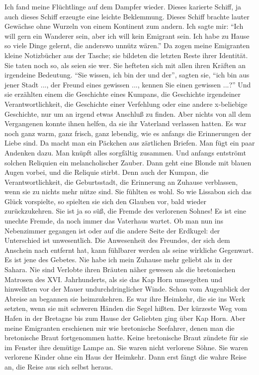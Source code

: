 \documentclass[12pt,ngerman,parskip=half]{scrartcl}
\begin{document}
Ich fand meine Flüchtlinge auf dem Dampfer wieder. Dieses karierte Schiff, ja auch dieses Schiff erzeugte eine leichte Beklemmung. Dieses Schiff brachte lauter Gewächse ohne Wurzeln von einem Kontinent zum andern. Ich sagte mir: \enquote{Ich will gern ein Wanderer sein, aber ich will kein Emigrant sein. Ich habe zu Hause so viele Dinge gelernt, die anderswo unnütz wären.} Da zogen meine Emigranten kleine Notizbücher aus der Tasche; sie bildeten die letzten Reste ihrer Identität. Sie taten noch so, als seien sie wer. Sie hefteten sich mit allen ihren Kräften an irgendeine Bedeutung. \enquote{Sie wissen, ich bin der und der}, sagten sie, \enquote{ich bin aus jener Stadt ..., der Freund eines gewissen ..., kennen Sie einen gewissen ...?} Und sie erzählten einem die Geschichte eines Kumpans, die Geschichte irgendeiner Verantwortlichkeit, die Geschichte einer Verfehlung oder eine andere x-beliebige Geschichte, nur um an irgend etwas Anschluß zu finden. Aber nichts von all dem Vergangenen konnte ihnen helfen, da sie ihr Vaterland verlassen hatten. Es war noch ganz warm, ganz frisch, ganz lebendig, wie es anfangs die Erinnerungen der Liebe sind. Da macht man ein Päckchen aus zärtlichen Briefen. Man fügt ein paar Andenken dazu. Man knüpft alles sorgfältig zusammen. Und anfangs entströmt solchen Reliquien ein melancholischer Zauber. Dann geht eine Blonde mit blauen Augen vorbei, und die Reliquie stirbt. Denn auch der Kumpan, die Verantwortlichkeit, die Geburtsstadt, die Erinnerung an Zuhause verblassen, wenn sie zu nichts mehr nütze sind. Sie fühlten es wohl. So wie Lissabon sich das Glück vorspielte, so spielten sie sich den Glauben vor, bald wieder zurückzukehren. Sie ist ja so süß, die Fremde des verlorenen Sohnes! Es ist eine unechte Fremde, da noch immer das Vaterhaus wartet. Ob man nun ins Nebenzimmer gegangen ist oder auf die andere Seite der Erdkugel: der Unterschied ist unwesentlich. Die Anwesenheit des Freundes, der sich dem Anschein nach entfernt hat, kann fühlbarer werden als seine wirkliche Gegenwart. Es ist jene des Gebetes. Nie habe ich mein Zuhause mehr geliebt als in der Sahara. Nie sind Verlobte ihren Bräuten näher gewesen als die bretonischen Matrosen des XVI. Jahrhunderts, als sie das Kap Horn umsegelten und hinwelkten vor der Mauer undurchdringlicher Winde. Schon vom Augenblick der Abreise an begannen sie heimzukehren. Es war ihre Heimkehr, die sie ins Werk setzten, wenn sie mit schweren Händen die Segel hißten. Der kürzeste Weg vom Hafen in der Bretagne bis zum Hause der Geliebten ging über Kap Horn. Aber meine Emigranten erschienen mir wie bretonische Seefahrer, denen man die bretonische Braut fortgenommen hatte. Keine bretonische Braut zündete für sie im Fenster ihre demütige Lampe an. Sie waren nicht verlorene Söhne. Sie waren verlorene Kinder ohne ein Haus der Heimkehr. Dann erst fängt die wahre Reise an, die Reise aus sich selbst heraus.
\end{document}
